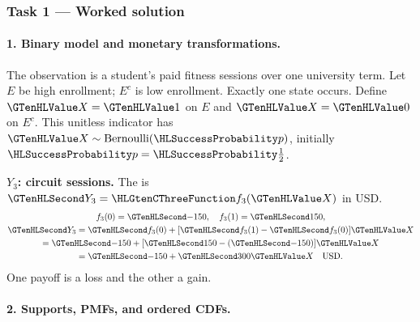 \subsubsection*{Task 1 --- Worked solution}\label{sol:c3-agriculture-model}
\paragraph{1. Binary model and monetary transformations.}
The observation is a student's paid fitness sessions over one university term. Let $E$ be high enrollment; $E^c$ is low enrollment. Exactly one state occurs. Define $\Indicator{X}=\Indicator{1}$ on $E$ and $\Indicator{X}=\Indicator{0}$ on $E^c$. This unitless indicator has $\Indicator{X}\sim\operatorname{Bernoulli}(\SuccessProb{p})$, initially $\SuccessProb{p}=\SuccessProb{\frac{1}{2}}$.
\noindent\begin{minipage}[t]{.48\linewidth}
\textbf{$Y_3$: circuit sessions.}
The  is $\Money{Y_3}=\TransformationFunction{f_3}(\Indicator{X})$ in USD.
\[
\begin{gathered}
f_3(0)=\Money{-150},\quad f_3(1)=\Money{150},\\
\Money{Y_3}=\Money{f_3(0)}+[\Money{f_3(1)}-\Money{f_3(0)}]\Indicator{X}\\
=\Money{-150}+[\Money{150}-(\Money{-150})]\Indicator{X}\\
=\Money{-150}+\Money{300}\Indicator{X}\quad\text{USD}.
\end{gathered}
\]
One payoff is a loss and the other a gain.
\end{minipage}\par
{}\paragraph{2. Supports, PMFs, and ordered CDFs.}

